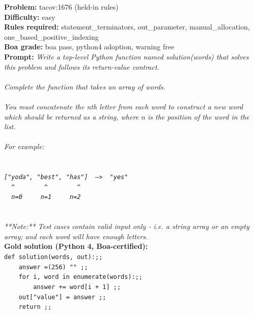 \begin{exbox}
  \textbf{Problem:} tacov:1676 (held-in rules)\\
  \textbf{Difficulty:} easy\\
  \textbf{Rules required:} statement\_terminators, out\_parameter, manual\_allocation, one\_based\_positive\_indexing\\
  \textbf{Boa grade:} boa pass, python4 adoption, warning free\\[3pt]
  \textbf{Prompt:} \textit{Write a top-level Python function named solution(words) that solves this problem and follows its return-value contract. \\
  \  \\
  Complete the function that takes an array of words. \\
  \  \\
  You must concatenate the \textasciigrave{}n\textasciigrave{}th letter from each word to construct a new word which should be returned as a string, where \textasciigrave{}n\textasciigrave{} is the position of the word in the list. \\
  \  \\
  For example: \\
  \  \\
  \textasciigrave{}\textasciigrave{}\textasciigrave{} \\
  \textup{\texttt{["yoda", "best", "has"]~~--\textgreater{}~~"yes"}} \\
  \textup{\texttt{~~\^{}~~~~~~~~\^{}~~~~~~~~\^{}}} \\
  \textup{\texttt{~~n=0~~~~~n=1~~~~~n=2}} \\
  \textasciigrave{}\textasciigrave{}\textasciigrave{} \\
  \  \\
  {}**Note:** Test cases contain valid input only - i.e. a string array or an empty array; and each word will have enough letters.}\\[3pt]
  \textbf{Gold solution (Python 4, Boa-certified):} \\
  \textup{\texttt{def solution(words, out):;;}} \\
  \textup{\texttt{~~~~answer =(256) "" ;;}} \\
  \textup{\texttt{~~~~for i, word in enumerate(words):;;}} \\
  \textup{\texttt{~~~~~~~~answer += word[i + 1] ;;}} \\
  \textup{\texttt{~~~~out["value"] = answer ;;}} \\
  \textup{\texttt{~~~~return ;;}}
\end{exbox}
